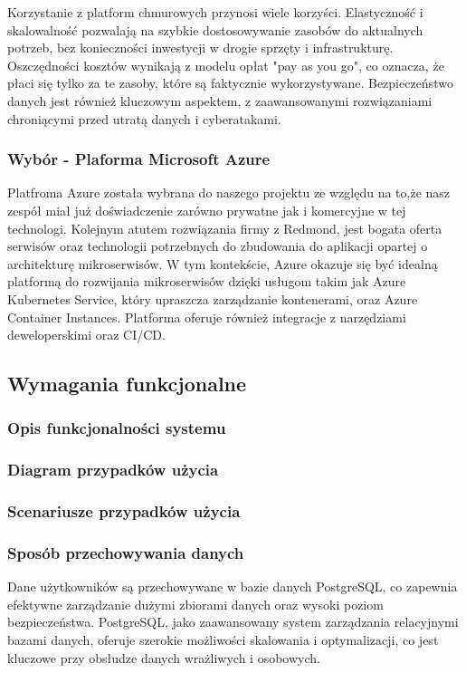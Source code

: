 Korzystanie z platform chmurowych przynosi wiele korzyści. Elastyczność i skalowalność pozwalają na szybkie dostosowywanie zasobów do aktualnych potrzeb, bez konieczności inwestycji w drogie sprzęty i infrastrukturę. Oszczędności kosztów wynikają z modelu opłat "pay as you go", co oznacza, że płaci się tylko za te zasoby, które są faktycznie wykorzystywane. Bezpieczeństwo danych jest również kluczowym aspektem, z zaawansowanymi rozwiązaniami chroniącymi przed utratą danych i cyberatakami.
\subsubsection{Wybór - Plaforma Microsoft Azure}
\clearpage
Platfroma Azure została wybrana do naszego projektu ze względu na to,że nasz zespół miał już doświadczenie zarówno prywatne jak i komercyjne w tej technologi. Kolejnym atutem rozwiązania firmy z Redmond, jest bogata oferta serwisów oraz technologii potrzebnych do zbudowania do aplikacji opartej o architekturę mikroserwisów.
W tym kontekście, Azure okazuje się być idealną platformą do rozwijania mikroserwisów dzięki usługom takim jak Azure Kubernetes Service, który upraszcza zarządzanie kontenerami, oraz Azure Container Instances. Platforma oferuje również integracje z narzędziami deweloperskimi oraz CI/CD.

\subsection{Wymagania funkcjonalne}

\subsubsection{Opis funkcjonalności systemu}

\subsubsection{Diagram przypadków użycia}

\subsubsection{Scenariusze przypadków użycia}

\subsubsection{Sposób przechowywania danych}
Dane użytkowników są przechowywane w bazie danych PostgreSQL, co zapewnia efektywne zarządzanie dużymi zbiorami danych oraz wysoki poziom bezpieczeństwa. PostgreSQL, jako zaawansowany system zarządzania relacyjnymi bazami danych, oferuje szerokie możliwości skalowania i optymalizacji, co jest kluczowe przy obsłudze danych wrażliwych i osobowych.

